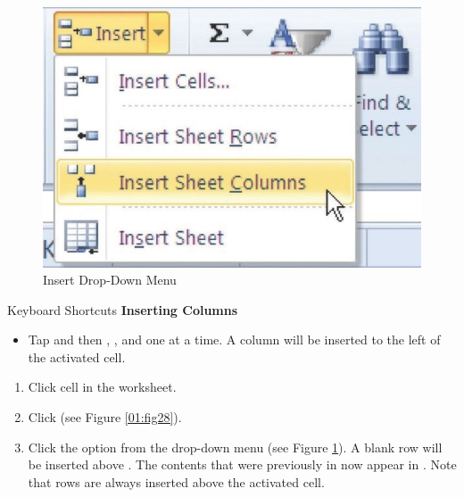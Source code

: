 \begin{figure}[H]
	\centering
	\includegraphics[width=\maxwidth{.95\linewidth}]{gfx/ch01_fig29}
	\caption{Insert Drop-Down Menu}
	\label{01:fig29}
\end{figure}

\begin{center}
	\begin{shtcutbox}{Keyboard Shortcuts}
		\textbf{Inserting Columns}
		\\
		\begin{itemize}
			\setlength{\itemsep}{0pt}
			\setlength{\parskip}{0pt}
			\setlength{\parsep}{0pt}
			
			\item Tap  and then , , and  one at a time. A column will be inserted to the left of the activated cell.
			
		\end{itemize}
	\end{shtcutbox}
\end{center}

\begin{enumbox}
	\begin{enumerate}
		\item Click cell  in the  worksheet.
		\item Click  (see Figure \ref{01:fig28}).
		\item Click the  option from the drop-down menu (see Figure \ref{01:fig29}). A blank row will be inserted above . The contents that were previously in  now appear in . Note that rows are always inserted above the activated cell.
	\end{enumerate}
\end{enumbox}

